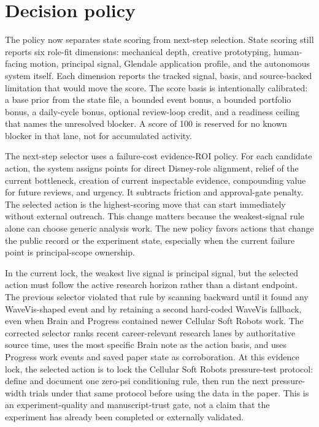 \documentclass[12pt,letterpaper]{article}
\begin{document}
\section{Decision policy}

The policy now separates state scoring from next-step selection. State scoring still reports six role-fit dimensions: mechanical depth, creative prototyping, human-facing motion, principal signal, Glendale application profile, and the autonomous system itself. Each dimension reports the tracked signal, basis, and source-backed limitation that would move the score. The score basis is intentionally calibrated: a base prior from the state file, a bounded event bonus, a bounded portfolio bonus, a daily-cycle bonus, optional review-loop credit, and a readiness ceiling that names the unresolved blocker. A score of 100 is reserved for no known blocker in that lane, not for accumulated activity.

The next-step selector uses a failure-cost evidence-ROI policy. For each candidate action, the system assigns points for direct Disney-role alignment, relief of the current bottleneck, creation of current inspectable evidence, compounding value for future reviews, and urgency. It subtracts friction and approval-gate penalty. The selected action is the highest-scoring move that can start immediately without external outreach. This change matters because the weakest-signal rule alone can choose generic analysis work. The new policy favors actions that change the public record or the experiment state, especially when the current failure point is principal-scope ownership.

In the current lock, the weakest live signal is principal signal, but the selected action must follow the active research horizon rather than a distant endpoint. The previous selector violated that rule by scanning backward until it found any WaveVis-shaped event and by retaining a second hard-coded WaveVis fallback, even when Brain and Progress contained newer Cellular Soft Robots work. The corrected selector ranks recent career-relevant research lanes by authoritative source time, uses the most specific Brain note as the action basis, and uses Progress work events and saved paper state as corroboration. At this evidence lock, the selected action is to lock the Cellular Soft Robots pressure-test protocol: define and document one zero-psi conditioning rule, then run the next pressure-width trials under that same protocol before using the data in the paper. This is an experiment-quality and manuscript-trust gate, not a claim that the experiment has already been completed or externally validated.
\end{document}
